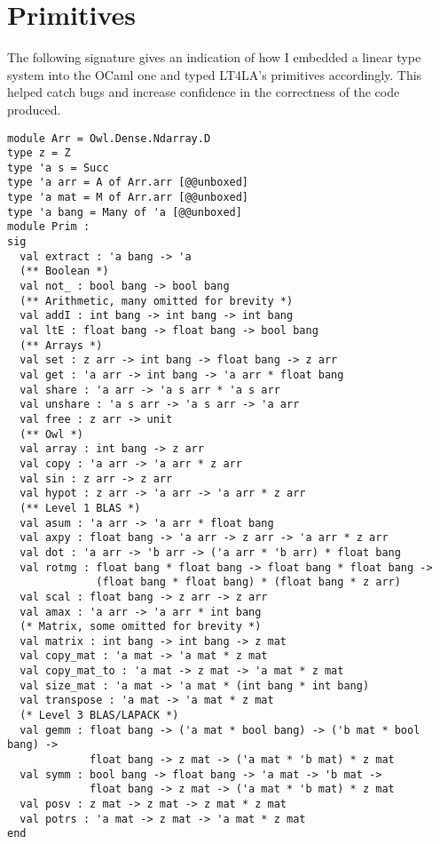 \chapter{Primitives}\label{chap:primitives}

The following signature gives an indication of how I embedded a linear type
system into the OCaml one and typed LT4LA's primitives accordingly. This helped
catch bugs and increase confidence in the correctness of the code produced.

\begin{verbatim}
module Arr = Owl.Dense.Ndarray.D
type z = Z
type 'a s = Succ
type 'a arr = A of Arr.arr [@@unboxed]
type 'a mat = M of Arr.arr [@@unboxed]
type 'a bang = Many of 'a [@@unboxed]
module Prim :
sig
  val extract : 'a bang -> 'a
  (** Boolean *)
  val not_ : bool bang -> bool bang
  (** Arithmetic, many omitted for brevity *)
  val addI : int bang -> int bang -> int bang
  val ltE : float bang -> float bang -> bool bang
  (** Arrays *)
  val set : z arr -> int bang -> float bang -> z arr
  val get : 'a arr -> int bang -> 'a arr * float bang
  val share : 'a arr -> 'a s arr * 'a s arr
  val unshare : 'a s arr -> 'a s arr -> 'a arr
  val free : z arr -> unit
  (** Owl *)
  val array : int bang -> z arr
  val copy : 'a arr -> 'a arr * z arr
  val sin : z arr -> z arr
  val hypot : z arr -> 'a arr -> 'a arr * z arr
  (** Level 1 BLAS *)
  val asum : 'a arr -> 'a arr * float bang
  val axpy : float bang -> 'a arr -> z arr -> 'a arr * z arr
  val dot : 'a arr -> 'b arr -> ('a arr * 'b arr) * float bang
  val rotmg : float bang * float bang -> float bang * float bang ->
              (float bang * float bang) * (float bang * z arr)
  val scal : float bang -> z arr -> z arr
  val amax : 'a arr -> 'a arr * int bang
  (* Matrix, some omitted for brevity *)
  val matrix : int bang -> int bang -> z mat
  val copy_mat : 'a mat -> 'a mat * z mat
  val copy_mat_to : 'a mat -> z mat -> 'a mat * z mat
  val size_mat : 'a mat -> 'a mat * (int bang * int bang)
  val transpose : 'a mat -> 'a mat * z mat
  (* Level 3 BLAS/LAPACK *)
  val gemm : float bang -> ('a mat * bool bang) -> ('b mat * bool bang) ->
             float bang -> z mat -> ('a mat * 'b mat) * z mat
  val symm : bool bang -> float bang -> 'a mat -> 'b mat ->
             float bang -> z mat -> ('a mat * 'b mat) * z mat
  val posv : z mat -> z mat -> z mat * z mat
  val potrs : 'a mat -> z mat -> 'a mat * z mat
end
\end{verbatim}
